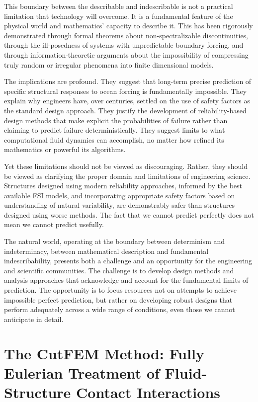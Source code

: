 ﻿\documentclass[a4paper,11pt]{article}
\theoremstyle{definition}
\begin{document}
This boundary between the describable and indescribable is not a practical limitation that technology will overcome. It is a fundamental feature of the physical world and mathematics' capacity to describe it. This has been rigorously demonstrated through formal theorems about non-spectralizable discontinuities, through the ill-posedness of systems with unpredictable boundary forcing, and through information-theoretic arguments about the impossibility of compressing truly random or irregular phenomena into finite dimensional models.

The implications are profound. They suggest that long-term precise prediction of specific structural responses to ocean forcing is fundamentally impossible. They explain why engineers have, over centuries, settled on the use of safety factors as the standard design approach. They justify the development of reliability-based design methods that make explicit the probabilities of failure rather than claiming to predict failure deterministically. They suggest limits to what computational fluid dynamics can accomplish, no matter how refined its mathematics or powerful its algorithms.

Yet these limitations should not be viewed as discouraging. Rather, they should be viewed as clarifying the proper domain and limitations of engineering science. Structures designed using modern reliability approaches, informed by the best available FSI models, and incorporating appropriate safety factors based on understanding of natural variability, are demonstrably safer than structures designed using worse methods. The fact that we cannot predict perfectly does not mean we cannot predict usefully.

The natural world, operating at the boundary between determinism and indeterminacy, between mathematical description and fundamental indescribability, presents both a challenge and an opportunity for the engineering and scientific communities. The challenge is to develop design methods and analysis approaches that acknowledge and account for the fundamental limits of prediction. The opportunity is to focus resources not on attempts to achieve impossible perfect prediction, but rather on developing robust designs that perform adequately across a wide range of conditions, even those we cannot anticipate in detail.

\section{The CutFEM Method: Fully Eulerian Treatment of Fluid-Structure Contact Interactions}
\end{document}
